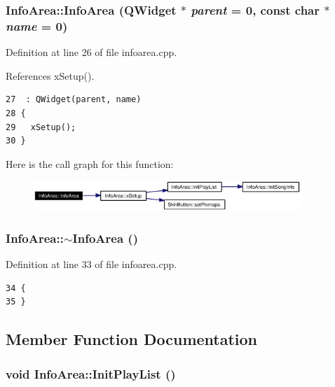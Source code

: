 \subsubsection{\setlength{\rightskip}{0pt plus 5cm}Info\-Area::Info\-Area ({\bf QWidget} $\ast$ {\em parent} = 0, const char $\ast$ {\em name} = 0)}\label{classInfoArea_InfoAreaa0}




Definition at line 26 of file infoarea.cpp.

References x\-Setup().



\footnotesize\begin{verbatim}27  : QWidget(parent, name)
28 {
29   xSetup();
30 }
\end{verbatim}\normalsize 


Here is the call graph for this function:\begin{figure}[H]
\begin{center}
\leavevmode
\includegraphics[width=286pt]{classInfoArea_InfoAreaa0_cgraph}
\end{center}
\end{figure}
\subsubsection{\setlength{\rightskip}{0pt plus 5cm}Info\-Area::$\sim${\bf Info\-Area} ()}\label{classInfoArea_InfoAreaa2}




Definition at line 33 of file infoarea.cpp.



\footnotesize\begin{verbatim}34 {
35 }
\end{verbatim}\normalsize 


\subsection{Member Function Documentation}
\subsubsection{\setlength{\rightskip}{0pt plus 5cm}void Info\-Area::Init\-Play\-List ()\hspace{0.3cm}{\tt  [private]}}\label{classInfoArea_InfoAread0}




